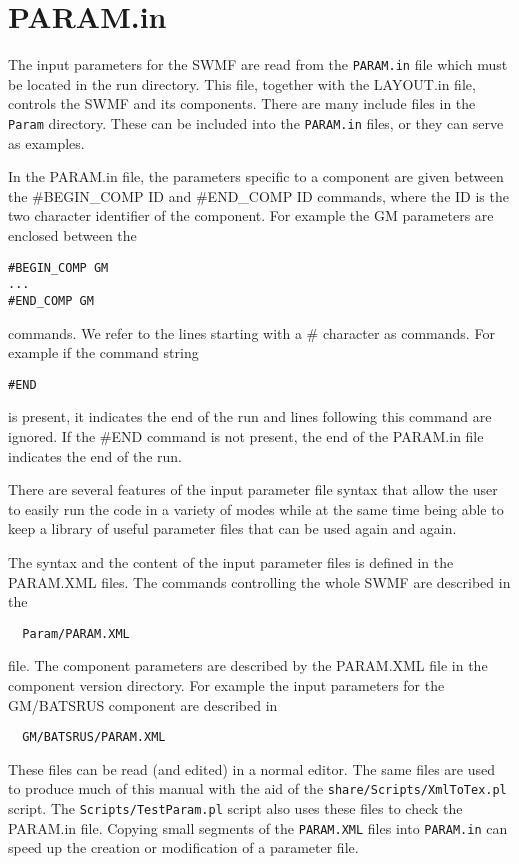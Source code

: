 %

\section{PARAM.in \label{section:param.in}}

The input parameters for the SWMF are read from the 
{\tt PARAM.in} file which must be located in the run directory.
This file, together with the LAYOUT.in file, controls the SWMF
and its components.
There are many include files in the {\tt Param} directory. These
can be included into the {\tt PARAM.in} files, or they can serve as
examples. 

In the PARAM.in file, 
the parameters specific to a component are given between
the \#BEGIN\_COMP ID and \#END\_COMP ID commands,
where the ID is the two character identifier of the component.
For example the GM parameters are enclosed between the 
\begin{verbatim}
#BEGIN_COMP GM
...
#END_COMP GM
\end{verbatim}
commands. We refer to the lines starting with a \# character as commands.
For example if the command string 
\begin{verbatim}
#END
\end{verbatim}
is present, it indicates the end of the run and lines following
this command are ignored. If the \#END command is not
present, the end of the PARAM.in file indicates the end of the run.

There are several features of the input parameter file syntax
that allow the user to easily run the code
in a variety of modes while at the same time being able to 
keep a library of useful parameter files that can be used
again and again.

The syntax and the content of the input parameter files
is defined in the PARAM.XML files. The commands controlling
the whole SWMF are described in the 
\begin{verbatim}
  Param/PARAM.XML
\end{verbatim}
file. The component parameters are described by the PARAM.XML
file in the component version directory. For example the
input parameters for the GM/BATSRUS component are described in
\begin{verbatim}
  GM/BATSRUS/PARAM.XML
\end{verbatim}
These files can be read (and edited) in a normal editor.
The same files are used to produce much of this
manual with the aid of the {\tt share/Scripts/XmlToTex.pl} script. 
The {\tt Scripts/TestParam.pl} script also uses these files
to check the PARAM.in file.
Copying small segments of the {\tt PARAM.XML} files
into {\tt PARAM.in} can speed up the creation or modification of a 
parameter file. 

